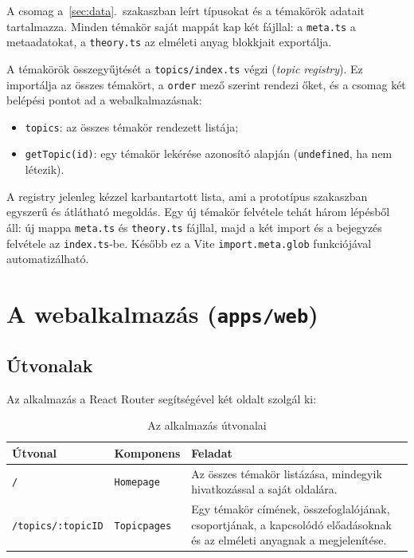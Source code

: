 \documentclass[12pt,a4paper]{report}
\begin{document}
A csomag a~\ref{sec:data}.~szakaszban leírt típusokat és a
témakörök adatait tartalmazza. Minden témakör saját mappát kap
két fájllal: a \texttt{meta.ts} a metaadatokat, a \texttt{theory.ts}
az elméleti anyag blokkjait exportálja.

A témakörök összegyűjtését a \texttt{topics/index.ts} végzi
(\emph{topic registry}). Ez importálja az összes témakört, a
\texttt{order} mező szerint rendezi őket, és a csomag két belépési
pontot ad a webalkalmazásnak:

\begin{itemize}
    \item \texttt{topics}: az összes témakör rendezett listája;
    \item \texttt{getTopic(id)}: egy témakör lekérése azonosító alapján
          (\texttt{undefined}, ha nem létezik).
\end{itemize}

A registry jelenleg kézzel karbantartott lista, ami a prototípus
szakaszban egyszerű és átlátható megoldás. Egy új témakör felvétele
tehát három lépésből áll: új mappa \texttt{meta.ts} és
\texttt{theory.ts} fájllal, majd a két import és a bejegyzés felvétele
az \texttt{index.ts}-be. Később ez a Vite \texttt{import.meta.glob}
funkciójával automatizálható.

\section{A webalkalmazás (\texttt{apps/web})}

\subsection{Útvonalak}

Az alkalmazás a React Router segítségével két oldalt szolgál ki:

\begin{table}[htbp]
    \centering
    \begin{tabularx}{\textwidth}{l l X}
        \toprule
        \textbf{Útvonal} & \textbf{Komponens} & \textbf{Feladat} \\
        \midrule
        \texttt{/}                  & \texttt{Homepage}   &
            Az összes témakör listázása, mindegyik hivatkozással a saját
            oldalára. \\
        \texttt{/topics/:topicID}   & \texttt{Topicpages} &
            Egy témakör címének, összefoglalójának, csoportjának, a
            kapcsolódó előadásoknak és az elméleti anyagnak a
            megjelenítése. \\
        \bottomrule
    \end{tabularx}
    \caption{Az alkalmazás útvonalai}
    \label{tab:routes}
\end{table}
\end{document}
